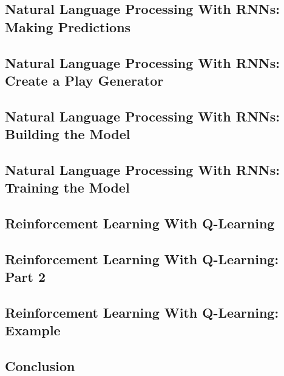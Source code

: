 \documentclass{article}%
\begin{document}
%
\subsection{Natural Language Processing With RNNs: Making Predictions}%
\label{subsec:NaturalLanguageProcessingWithRNNsMakingPredictions}%

%
\subsection{Natural Language Processing With RNNs: Create a Play Generator}%
\label{subsec:NaturalLanguageProcessingWithRNNsCreateaPlayGenerator}%

%
\subsection{Natural Language Processing With RNNs: Building the Model}%
\label{subsec:NaturalLanguageProcessingWithRNNsBuildingtheModel}%

%
\subsection{Natural Language Processing With RNNs: Training the Model}%
\label{subsec:NaturalLanguageProcessingWithRNNsTrainingtheModel}%

%
\subsection{Reinforcement Learning With Q{-}Learning}%
\label{subsec:ReinforcementLearningWithQ{-}Learning}%

%
\subsection{Reinforcement Learning With Q{-}Learning: Part 2}%
\label{subsec:ReinforcementLearningWithQ{-}LearningPart2}%

%
\subsection{Reinforcement Learning With Q{-}Learning: Example}%
\label{subsec:ReinforcementLearningWithQ{-}LearningExample}%

%
\subsection{Conclusion}%
\label{subsec:Conclusion}%

%
\newpage%
\end{document}
